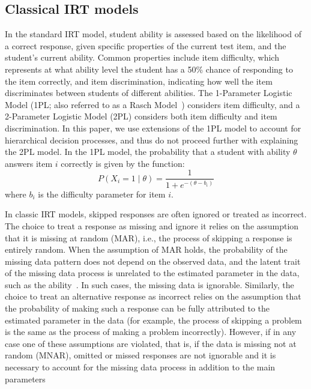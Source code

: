 \documentclass[manuscript]{acmart}
\begin{document}
\subsection{Classical IRT models}
In the standard IRT model, student ability is assessed based on the likelihood of a correct response, given specific properties of the current test item, and the student's current ability. Common properties include item difficulty, which represents at what ability level the student has a 50\% chance of responding to the item correctly, and item discrimination, indicating how well the item discriminates between students of different abilities. The 1-Parameter Logistic Model (1PL; also referred to as a Rasch Model~\cite{rasch1993probabilistic}) considers item difficulty, and a 2-Parameter Logistic Model (2PL) considers both item difficulty and item discrimination. In this paper, we use extensions of the 1PL model to account for hierarchical decision processes, and thus do not proceed further with explaining the 2PL model. In the 1PL model, the probability that a student with ability $\theta$ answers item $i$ correctly is given by the function: 
\begin{equation}
  P(X_i = 1 \mid \theta) = \frac{1}{1 + e^{-(\theta - b_i)}}
\end{equation}
where $b_i$ is the difficulty parameter for item $i$. 

In classic IRT models, skipped responses are often ignored or treated as incorrect. The choice to treat a response as missing and ignore it relies on the assumption that it is missing at random (MAR), i.e., the process of skipping a response is entirely random. When the assumption of MAR holds, the probability of the missing data pattern does not depend on the observed data, and the latent trait of the missing data process is unrelated to the estimated parameter in the data, such as the ability~\cite{rubin1976inference}. In such cases, the missing data is ignorable. Similarly, the choice to treat an alternative response as incorrect relies on the assumption that the probability of making such a response can be fully attributed to the estimated parameter in the data (for example, the process of skipping a problem is the same as the process of making a problem incorrectly). However, if in any case one of these assumptions are violated, that is, if the data is missing not at random (MNAR), omitted or missed responses are not ignorable and it is necessary to account for the missing data process in addition to the main parameters~\cite{little2019statistical}
\end{document}
